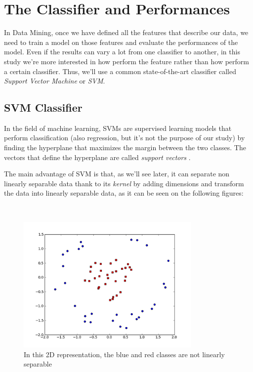 \section{The Classifier and Performances}
In Data Mining, once we have defined all the features that describe our data, we need to train a model on those features and evaluate the performances of the model. Even if the results can vary a lot from one classifier to another, in this study we're more interested in how perform the feature rather than how perform a certain classifier. Thus, we'll use a common state-of-the-art classifier called \emph{Support Vector Machine} or \emph{SVM}.

\subsection{SVM Classifier}
In the field of machine learning, SVMs are supervised learning models that perform classification (also regression, but it's not the purpose of our study) by finding the hyperplane that maximizes the margin between the two classes. The vectors that define the hyperplane are called \emph{support vectors} \cite{Boser:1992}.

The main advantage of SVM is that, as we'll see later, it can separate non linearly separable data thank to its \emph{kernel} by adding dimensions and transform the data into linearly separable data, as it can be seen on the following figures:

\
\begin{figure}[H]
    \centering
    \includegraphics[width=0.8\textwidth]{fig/svm-nonlin.png}
    \caption[Short caption]{In this 2D representation, the blue and red classes are not linearly separable}
    \label{fig:svm-nonlin}
\end{figure}

